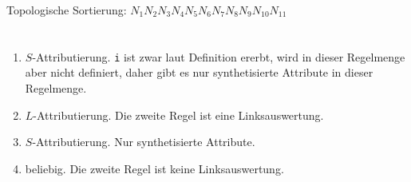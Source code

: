 \documentclass[a4paper,10pt]{scrartcl}
\begin{document}
\begin{enumerate}
\begin{center}
{{{{                            
                        }
                    }
                }
                \Tr{$+$}
            }
        \end{center}
        Topologische Sortierung: $N_1N_2N_3N_4N_5N_6N_7N_8N_9N_{10}N_{11}$
\end{enumerate}

\section{}
\begin{enumerate}
\item   $S$-Attributierung. \texttt{i} ist zwar laut Definition ererbt, wird in dieser Regelmenge aber nicht definiert, daher gibt es nur synthetisierte Attribute in dieser Regelmenge.
\item   $L$-Attributierung. Die zweite Regel ist eine Linksauswertung.
\item   $S$-Attributierung. Nur synthetisierte Attribute.
\item   beliebig. Die zweite Regel ist keine Linksauswertung.
\end{enumerate}
\end{document}
